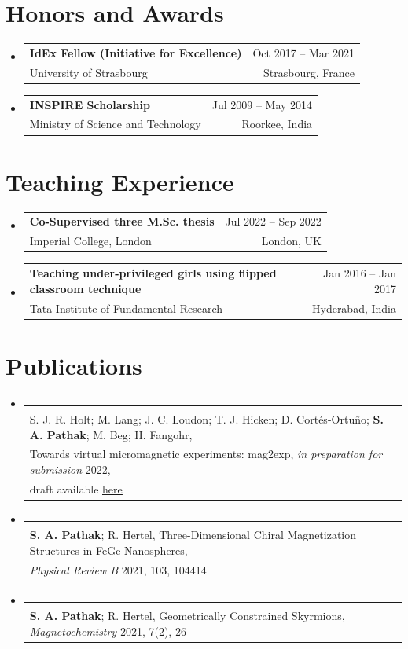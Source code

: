 \documentclass[A4,11pt]{article}
\makeatletter
\newcommand{\CVSubheading}[4]{
  \vspace{-2pt}\item
    \begin{tabular*}{0.97\textwidth}[t]{l@{\extracolsep{\fill}}r}
      \textbf{#1} & #2 \\
      \small#3 & \small #4 \\
    \end{tabular*}\vspace{-7pt}
}
\newcommand{\CVSubHeadingListStart}{\begin{itemize}[leftmargin=0.5cm, label={}]}
\newcommand{\CVSubHeadingListEnd}{\end{itemize}}
\makeatother
\begin{document}
\section{Honors and Awards}
  \CVSubHeadingListStart
    \CVSubheading
    {IdEx Fellow (Initiative for Excellence)}{Oct 2017 -- Mar 2021}
      {University of Strasbourg}{Strasbourg, France}
    \CVSubheading
    {INSPIRE Scholarship}{Jul 2009 -- May 2014}
      {Ministry of Science and Technology}{Roorkee, India}
  \CVSubHeadingListEnd

\section{Teaching Experience}
  \CVSubHeadingListStart
    \CVSubheading
      {Co-Supervised three M.Sc. thesis}{Jul 2022 -- Sep 2022}
      {Imperial College, London}{London, UK}
    \CVSubheading
      {Teaching under-privileged girls using flipped classroom
      technique}{Jan 2016 -- Jan 2017}
      {Tata Institute of Fundamental Research}{Hyderabad, India}
  \CVSubHeadingListEnd

\section{Publications}
  \CVSubHeadingListStart
    \CVSubheading
      {}{}
      {S. J. R. Holt; M. Lang; J. C. Loudon; T. J. Hicken; D. Cortés-Ortuño;
        \textbf{S. A. Pathak}; M. Beg; H. Fangohr,\\
        Towards virtual micromagnetic experiments: mag2exp, \textit{in
        preparation for submission} 2022,\\ draft available
        \href{https://s.gwdg.de/8QRRcD}{\color{blue} \underline{here}}}{}
    \CVSubheading
      {}{}
      {\textbf{S. A. Pathak}; R. Hertel, Three-Dimensional Chiral Magnetization Structures in FeGe
        Nanospheres,\\ \textit{Physical Review B} 2021, 103, 104414}{}
    \CVSubheading
      {}{}
      {\textbf{S. A. Pathak}; R. Hertel, Geometrically Constrained Skyrmions,
        \textit{Magnetochemistry} 2021, 7(2), 26}{}
  \CVSubHeadingListEnd
\end{document}
